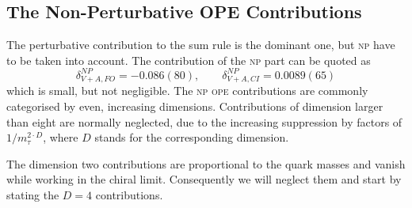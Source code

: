 \documentclass[../../index.tex]{subfiles}
\begin{document}
\subsection{The Non-Perturbative OPE Contributions}
The perturbative contribution to the sum rule is the dominant one, but
\textsc{np} have to be taken into account. The contribution of the \textsc{np}
part can be quoted as \cite{Jamin2013}
\begin{equation}
  \delta_{V+A,FO}^{NP} = -0.086(80), \qquad \delta_{V+A,CI}^{NP} = 0.0089(65)
\end{equation}
which is small, but not negligible. The \textsc{np} \textsc{ope} contributions
are commonly categorised by even, increasing dimensions. Contributions of
dimension larger than eight are normally neglected, due to the increasing
suppression by factors of \(1/m_\tau^{2\cdot D}\), where \(D\) stands for the
corresponding dimension.

The dimension two contributions are proportional to the quark masses and vanish
while working in the chiral limit. Consequently we will neglect them and start
by stating the \(D=4\) contributions.
\end{document}
